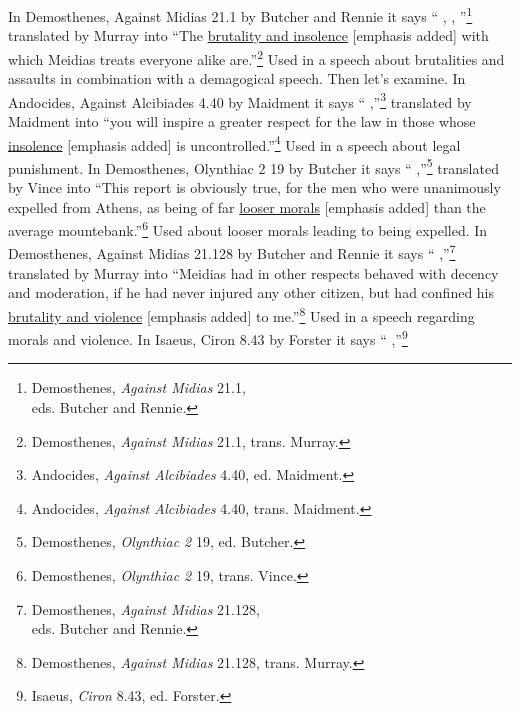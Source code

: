 In Demosthenes, Against Midias 21.1 by Butcher and Rennie it says `` \underline{}, , ''\footnote{Demosthenes, \emph{Against Midias} 21.1,\\eds. Butcher and Rennie.}
translated by Murray into ``The \underline{brutality and insolence} [emphasis added] with which Meidias treats everyone alike are.''\footnote{Demosthenes, \emph{Against Midias} 21.1, trans. Murray.} Used in a speech about brutalities and assaults in combination with a demagogical speech. 
Then let's examine.
In Andocides, Against Alcibiades 4.40 by Maidment it says `` \underline{} ,''\footnote{Andocides, \emph{Against Alcibiades} 4.40, ed. Maidment.}
translated by Maidment into ``you will inspire a greater respect for the law in those whose \underline{insolence} [emphasis added] is uncontrolled.''\footnote{Andocides, \emph{Against Alcibiades} 4.40, trans. Maidment.} Used in a speech about legal punishment. 
In Demosthenes, Olynthiac 2 19 by Butcher it says `` \underline{} ,''\footnote{Demosthenes, \emph{Olynthiac 2} 19, ed. Butcher.}
translated by Vince into ``This report is obviously true, for the men who were unanimously expelled from Athens, as being of far \underline{looser morals} [emphasis added] than the average mountebank.''\footnote{Demosthenes, \emph{Olynthiac 2} 19, trans. Vince.} Used about looser morals leading to being expelled. 
In Demosthenes, Against Midias 21.128 by Butcher and Rennie it says `` \underline{} ,''\footnote{Demosthenes, \emph{Against Midias} 21.128,\\eds. Butcher and Rennie.}
translated by Murray into ``Meidias had in other respects behaved with decency and moderation, if he had never injured any other citizen, but had confined his \underline{brutality and violence} [emphasis added] to me.''\footnote{Demosthenes, \emph{Against Midias} 21.128, trans. Murray.} Used in a speech regarding morals and violence.
In Isaeus, Ciron 8.43 by Forster it says `` \underline{} ,''\footnote{Isaeus, \emph{Ciron} 8.43, ed. Forster.} 
